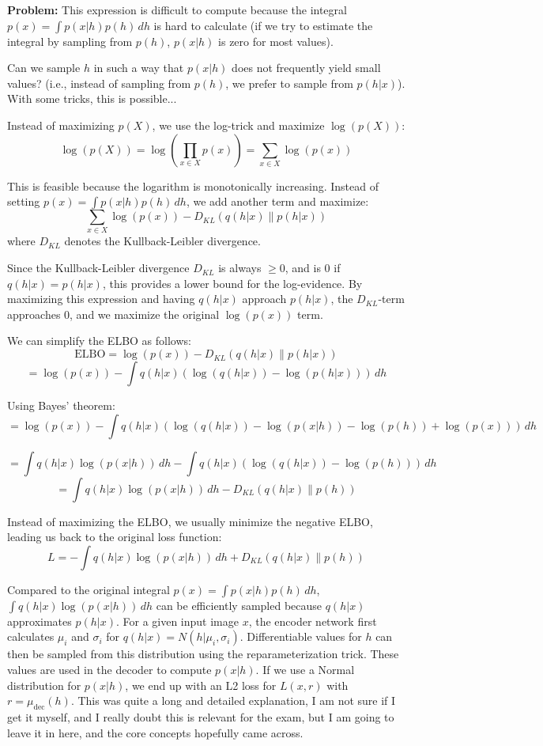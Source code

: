\documentclass[a4paper]{article}
\begin{document}
\textbf{Problem:} This expression is difficult to compute because the integral \( p(x) = \int p(x|h)p(h) \, dh \) is hard to calculate (if we try to estimate the integral by sampling from \( p(h) \), \( p(x|h) \) is zero for most values).

 Can we sample \( h \) in such a way that \( p(x|h) \) does not frequently yield small values? (i.e., instead of sampling from \( p(h) \), we prefer to sample from \( p(h|x) \)). With some tricks, this is possible...

Instead of maximizing \( p(X) \), we use the log-trick and maximize \( \log(p(X)) \):
\[
\log(p(X)) = \log \left( \prod_{x \in X} p(x) \right) = \sum_{x \in X} \log(p(x))
\]

This is feasible because the logarithm is monotonically increasing. Instead of setting \( p(x) = \int p(x|h)p(h) \, dh \), we add another term and maximize:
\[
\sum_{x \in X} \log(p(x)) - D_{KL} (q(h|x) \| p(h|x))
\]
where \( D_{KL} \) denotes the Kullback-Leibler divergence.

Since the Kullback-Leibler divergence \( D_{KL} \) is always \( \geq 0 \), and is \( 0 \) if \( q(h|x) = p(h|x) \), this provides a lower bound for the log-evidence. By maximizing this expression and having \( q(h|x) \) approach \( p(h|x) \), the \( D_{KL} \)-term approaches 0, and we maximize the original \( \log(p(x)) \) term.

We can simplify the ELBO as follows:
\[
\text{ELBO} = \log(p(x)) - D_{KL}(q(h|x) \| p(h|x))
\]
\[
= \log(p(x)) - \int q(h|x) \left( \log(q(h|x)) - \log(p(h|x)) \right) \, dh
\]

Using Bayes' theorem:
\[
= \log(p(x)) - \int q(h|x) \left( \log(q(h|x)) - \log(p(x|h)) - \log(p(h)) + \log(p(x)) \right) \, dh
\]

\[
= \int q(h|x) \log(p(x|h)) \, dh - \int q(h|x) \left( \log(q(h|x)) - \log(p(h)) \right) \, dh
\]
\[
= \int q(h|x) \log(p(x|h)) \, dh - D_{KL}(q(h|x) \| p(h))
\]

Instead of maximizing the ELBO, we usually minimize the negative ELBO, leading us back to the original loss function:
\[
L = - \int q(h|x) \log(p(x|h)) \, dh + D_{KL}(q(h|x) \| p(h))
\]

Compared to the original integral \( p(x) = \int p(x|h)p(h) \, dh \), \( \int q(h|x) \log(p(x|h)) \, dh \) can be efficiently sampled because \( q(h|x) \) approximates \( p(h|x) \). For a given input image \( x \), the encoder network first calculates \( \mu_i \) and \( \sigma_i \) for \( q(h|x) = N(h|\mu_i, \sigma_i) \). Differentiable values for \( h \) can then be sampled from this distribution using the reparameterization trick. These values are used in the decoder to compute \( p(x|h) \). If we use a Normal distribution for \( p(x|h) \), we end up with an L2 loss for \( L(x, r) \) with \( r = \mu_{\text{dec}}(h) \).
 This was quite a long and detailed explanation, I am not sure if I get it myself, and I really doubt this is relevant for the exam, but I am going to leave it in here, and the core concepts hopefully came across.
\end{document}
